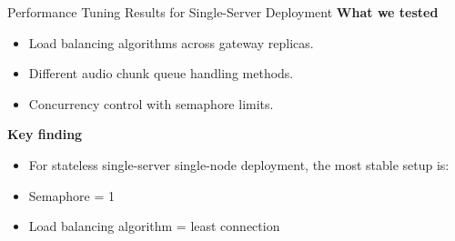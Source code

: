 \documentclass[aspectratio=169]{beamer}
\begin{document}
\begin{frame}{Performance Tuning Results for Single-Server Deployment}
\textbf{What we tested}
\begin{itemize}
  \item Load balancing algorithms across gateway replicas.
  \item Different audio chunk queue handling methods.
  \item Concurrency control with semaphore limits.
\end{itemize}

\vspace{0.4em}
\textbf{Key finding}
\begin{itemize}
  \item For stateless single-server single-node deployment, the most stable setup is:
  \item Semaphore = 1
  \item Load balancing algorithm = least connection
\end{itemize}
\end{frame}
\end{document}
